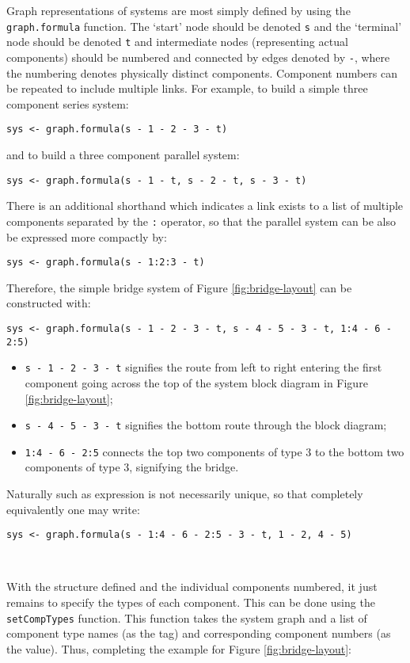 \documentclass[12pt, a4paper]{elsarticle}
\begin{document}
Graph representations of systems are most simply defined by using the 
\texttt{graph.formula} function.  The `start' node should be denoted
\texttt{s} and the `terminal' node should be denoted \texttt{t} and
intermediate nodes (representing actual components) should be numbered and
connected by edges denoted by \texttt{-}, where the numbering denotes physically
distinct components.  Component numbers can be repeated to include
multiple links.  For example, to build a simple three component series
system:

\noindent\texttt{sys <- graph.formula(s\,-\,1\,-\,2\,-\,3\,-\,t)}

and to build a three component parallel system:

\noindent\texttt{sys <- graph.formula(s\,-\,1\,-\,t, s\,-\,2\,-\,t, s\,-\,3\,-\,t)}

There is an additional shorthand which indicates a link exists to a list of multiple components separated by the \texttt{:} operator, so that the parallel system can be also be expressed more compactly by:

\noindent\texttt{sys <- graph.formula(s\,-\,1:2:3\,-\,t)}

Therefore, the simple bridge system of Figure \ref{fig:bridge-layout} can be constructed with:

\noindent\texttt{sys <- graph.formula(s\,-\,1\,-\,2\,-\,3\,-\,t, s\,-\,4\,-\,5\,-\,3\,-\,t, 1:4\,-\,6\,-\,2:5)}
\begin{itemize}
  \item \texttt{s\,-\,1\,-\,2\,-\,3\,-\,t} signifies the route from left to right entering the first component going across the top of the system block diagram in Figure \ref{fig:bridge-layout};
  \item \texttt{s\,-\,4\,-\,5\,-\,3\,-\,t} signifies the bottom route through the block diagram;
  \item \texttt{1:4\,-\,6\,-\,2:5} connects the top two components of type 3 to the bottom two components of type 3, signifying the bridge.
\end{itemize}
Naturally such as expression is not necessarily unique, so that completely equivalently one may write:

\noindent\texttt{sys <- graph.formula(s\,-\,1:4\,-\,6\,-\,2:5\,-\,3\,-\,t, 1\,-\,2, 4\,-\,5)}

\ 

With the structure defined and the individual components numbered, it 
just remains to specify the types of each component.  This can be done
using the \texttt{setCompTypes} function.  This function takes the
system graph and a list of component type names (as the tag) and corresponding
component numbers (as the value).  Thus, completing the example for Figure
\ref{fig:bridge-layout}:
\end{document}

